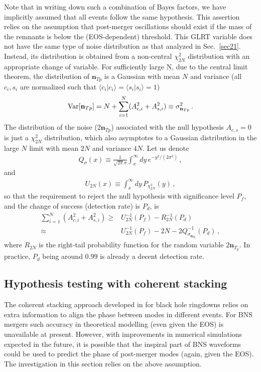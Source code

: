\documentclass[prd,aps,floatfix,superscriptaddress,nofootinbib,twocolumn,10pt,English]{revtex4-1}
\begin{document}
Note that in writing down such a combination of Bayes factors, we have implicitly 
assumed that all events follow the same hypothesis. This assertion relies on
the assumption that post-merger oscillations should exist if the mass of the 
remnants is below the (EOS-dependent) threshold.
This GLRT variable does not have the same type of noise distribution
as that analyzed in Sec.~\ref{sec21}.  Instead, its
distribution is obtained from a non-central $\chi^2_{2N}$ distribution
with an appropriate change of variable.  For sufficiently large N, due
to the central limit theorem, the distribution of $\mathbf{n}_{Tp}$ is a
Gaussian
with mean $N$ and variance (all $c_i, s_i$ are normalized such that
$\langle c_i | c_i \rangle = \langle s_i | s_i \rangle =1$)
\begin{align}
{\rm Var} [\mathbf{n}_{Tp}] = N+\sum^N_{i=1} (A^2_{c,i}+A^2_{s,i}) \equiv \sigma^2_{\mathbf{n}_{Tp}}\,.
\end{align}
The distribution of the noise ($2 \mathbf{n}_{Tp}$) 
associated with the null
hypothesis $A_{c,s} =0$ is just a $\chi^2_{2N}$ distribution, which
also asymptotes to a Gaussian distribution in the large $N$ limit with
mean $2 N$ and variance $4 N$.  Let us denote
\begin{align}
Q_\sigma (x) \equiv  \frac{1}{\sqrt{2\pi} \sigma} \int^\infty_x dy\,e^{-y^2/(2\sigma^2)} \,,
\end{align}
and 
\begin{align}
U_{2N} (x) \equiv \int^\infty_x dy\, P_{\chi^2_{2N}} (y)\,,
\end{align}
so that the requirement to reject the null hypothesis with significance level $P_f$, and 
the change of success (detection rate) is $P_d$, is
\begin{align}\label{eqpg}
\sum^N_{i=1} (A^2_{c,i}+A^2_{s,i}) \ge & U_{2N}^{-1} (P_f)-R_{2N}^{-1}(P_d)\nonumber \\
\approx &  U_{2N}^{-1} (P_f)-2N-2Q^{-1}_{\sigma_{\mathbf{n}_{Tp}}}(P_d)\,,
\end{align}
where $R_{2N}$ is the right-tail probability function for the
random variable $2 \mathbf{n}_{T_p}$. In practice, $P_d$
being around $0.99$ is already a decent detection rate.


\subsection{Hypothesis testing with coherent stacking}\label{sec31}

The coherent stacking approach developed in \cite{yang2017black} for black hole
ringdowns relies on extra information to align the phase between modes
in different events. For BNS mergers such accuracy in theoretical
modelling (even given the EOS) is unavailable at present. However,
with improvements in numerical simulations expected in the future, it
is possible that the inspiral part of BNS waveforms could be used to
predict the phase of post-merger modes (again, given the EOS). The
investigation in this section relies on the above assumption.
\end{document}
